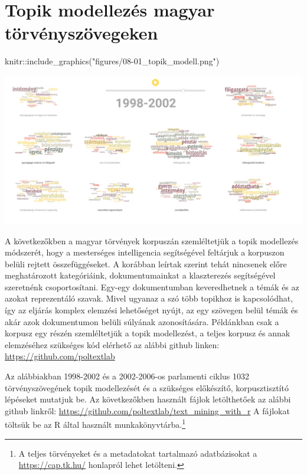 \documentclass[
]{book}
\newenvironment{Shaded}{\begin{snugshade}}{\end{snugshade}}
\newcommand{\FunctionTok}[1]{\textcolor[rgb]{0.00,0.00,0.00}{#1}}
\newcommand{\NormalTok}[1]{#1}
\newcommand{\SpecialCharTok}[1]{\textcolor[rgb]{0.00,0.00,0.00}{#1}}
\newcommand{\StringTok}[1]{\textcolor[rgb]{0.31,0.60,0.02}{#1}}
\begin{document}
\hypertarget{topik-modellezuxe9s-magyar-tuxf6rvuxe9nyszuxf6vegeken}{%
\section{Topik modellezés magyar
törvényszövegeken}\label{topik-modellezuxe9s-magyar-tuxf6rvuxe9nyszuxf6vegeken}}

\begin{Shaded}
\begin{Highlighting}[]
\NormalTok{knitr}\SpecialCharTok{::}\FunctionTok{include\_graphics}\NormalTok{(}\StringTok{"figures/08{-}01\_topik\_modell.png"}\NormalTok{)}
\end{Highlighting}
\end{Shaded}

\begin{center}\includegraphics[width=0.9\linewidth]{figures/08-01_topik_modell} \end{center}

A következőkben a magyar törvények korpuszán szemléltetjük a topik
modellezés módszerét, hogy a mesterséges intelligencia segítségével
feltárjuk a korpuszon belüli rejtett összefüggéseket. A korábban leírtak
szerint tehát nincsenek előre meghatározott kategóriáink,
dokumentumainkat a klaszterezés segítségével szeretnénk csoportosítani.
Egy-egy dokumentumban keveredhetnek a témák és az azokat reprezentáló
szavak. Mivel ugyanaz a szó több topikhoz is kapcsolódhat, így az
eljárás komplex elemzési lehetőséget nyújt, az egy szövegen belül témák
és akár azok dokumentumon belüli súlyának azonosítására. Példánkban csak
a korpusz egy részén szemléltetjük a topik modellezést, a teljes korpusz
és annak elemzéséhez szükséges kód elérhető az alábbi github linken:
\url{https://github.com/poltextlab}

Az alábbiakban 1998-2002 és a 2002-2006-os parlamenti ciklus 1032
törvényszövegének topik modellezését és a szükséges előkészítő,
korpusztisztító lépéseket mutatjuk be. Az következőkben használt fájlok
letölthetőek az alábbi github linkről:
\url{https://github.com/poltextlab/text_mining_with_r} A fájlokat
töltsük be az R által használt munkakönyvtárba.\footnote{A teljes
  törvényeket és a metadatokat tartalmazó adatbázisokat a
  \url{https://cap.tk.hu/} honlapról lehet letölteni.}
\end{document}

